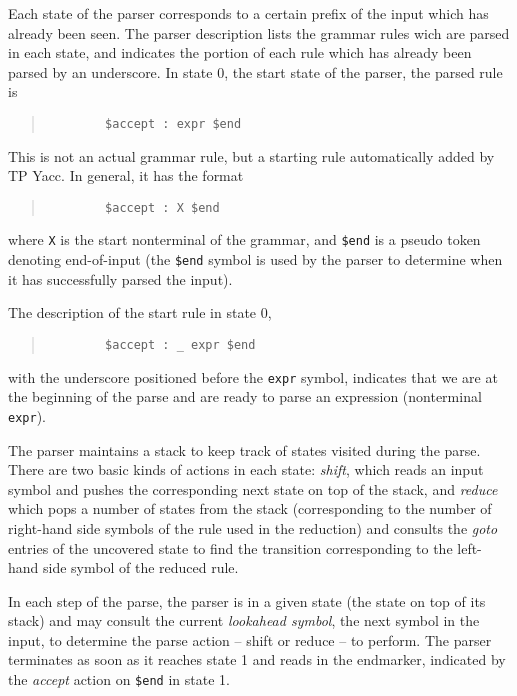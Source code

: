 Each state of the parser corresponds to a certain prefix of the input
which has already been seen. The parser description lists the grammar
rules wich are parsed in each state, and indicates the portion of each
rule which has already been parsed by an underscore. In state 0, the
start state of the parser, the parsed rule is
\begin{quote}\begin{verbatim}
        $accept : expr $end
\end{verbatim}\end{quote}

This is not an actual grammar rule, but a starting rule automatically
added by TP Yacc. In general, it has the format
\begin{quote}\begin{verbatim}
        $accept : X $end
\end{verbatim}\end{quote}
where \verb"X" is the start nonterminal of the grammar, and \verb"$end" is
a pseudo token denoting end-of-input (the \verb"$end" symbol is used by the
parser to determine when it has successfully parsed the input).

The description of the start rule in state 0,
\begin{quote}\begin{verbatim}
        $accept : _ expr $end
\end{verbatim}\end{quote}
with the underscore positioned before the \verb"expr" symbol, indicates that
we are at the beginning of the parse and are ready to parse an expression
(nonterminal \verb"expr").

The parser maintains a stack to keep track of states visited during the
parse. There are two basic kinds of actions in each state: {\em shift\/},
which reads an input symbol and pushes the corresponding next state on top of
the stack, and {\em reduce\/} which pops a number of states from the stack
(corresponding to the number of right-hand side symbols of the rule used
in the reduction) and consults the {\em goto\/} entries of the uncovered
state to find the transition corresponding to the left-hand side symbol of the
reduced rule.

In each step of the parse, the parser is in a given state (the state on
top of its stack) and may consult the current {\em lookahead symbol\/}, the
next symbol in the input, to determine the parse action -- shift or reduce --
to perform. The parser terminates as soon as it reaches state 1 and reads
in the endmarker, indicated by the {\em accept\/} action on \verb"$end" in
state 1.

